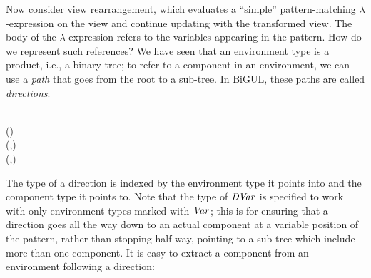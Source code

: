 Now consider view rearrangement, which evaluates a ``simple'' pattern-matching $\lambda$-expression on the view and continue updating with the transformed view.
The body of the $\lambda$-expression refers to the variables appearing in the pattern.
How do we represent such references?
We have seen that an environment type is a product, i.e., a binary tree; to refer to a component in an environment, we can use a \emph{path} that goes from the root to a sub-tree.
In BiGUL, these paths are called \emph{directions}:
\begin{hscode}\SaveRestoreHook
{}%
%
%
%
%
%
%
\>[B]{}\;\;\;\;\<[E]%
\\
\>[B]{}\<[3]%
\>[3]{}\<[11]%
\>[11]{}\mathbin{::}{}\<[11E]%
\>[15]{}\;(\;)\;\<[E]%
\\
\>[B]{}\<[3]%
\>[3]{}\<[11]%
\>[11]{}\mathbin{::}{}\<[11E]%
\>[15]{}\;\;{}\<[28]%
\>[28]{}\to {}\;(,)\;\<[E]%
\\
\>[B]{}\<[3]%
\>[3]{}\<[11]%
\>[11]{}\mathbin{::}{}\<[11E]%
\>[15]{}\;\;{}\<[28]%
\>[28]{}\to {}\;(,)\;\<[E]%
\ColumnHook
\end{hscode}\resethooks
The type of a direction is indexed by the environment type it points into and the component type it points to.
Note that the type of \ensuremath{\Conid{DVar}} is specified to work with only environment types marked with \ensuremath{\Conid{Var}}; this is for ensuring that a direction goes all the way down to an actual component at a variable position of the pattern, rather than stopping half-way, pointing to a sub-tree which include more than one component.
It is easy to extract a component from an environment following a direction:

